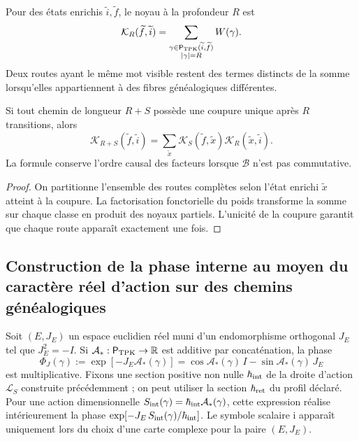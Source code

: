 Pour des états enrichis \(\widetilde i,\widetilde f\), le noyau à la
profondeur \(R\) est
\begin{equation}
 \mathcal K_R(\widetilde f,\widetilde i)
 =\sum_{\substack{
   \gamma\in\mathsf P_{\rm TPK}(\widetilde i,\widetilde f)\\
   |\gamma|=R}}
 W(\gamma).
 \label{x_reciprocidad:eq:kernel-genealogico-finito-rev2}
\end{equation}
Deux routes ayant le même mot visible restent des termes distincts de la somme
lorsqu’elles appartiennent à des fibres généalogiques différentes.

\begin{proposition}
\label{x_reciprocidad:prop:composicion-kernel-enriquecido-rev2}
Si tout chemin de longueur \(R+S\) possède une coupure unique après \(R\) transitions, alors
\[
 \mathcal K_{R+S}(\widetilde f,\widetilde i)
 =\sum_{\widetilde x}
 \mathcal K_S(\widetilde f,\widetilde x)
 \mathcal K_R(\widetilde x,\widetilde i).
\]
La formule conserve l’ordre causal des facteurs lorsque \(\mathcal B\) n’est pas
commutative.
\end{proposition}

\begin{proof}
On partitionne l’ensemble des routes complètes selon l’état enrichi
\(\widetilde x\) atteint à la coupure. La factorisation fonctorielle du poids
transforme la somme sur chaque classe en produit des noyaux partiels.
L’unicité de la coupure garantit que chaque route apparaît exactement une fois.
\end{proof}

\subsection{Construction de la phase interne au moyen du caractère réel d'action sur des chemins généalogiques}

Soit \((E,J_E)\) un espace euclidien réel muni d’un endomorphisme
orthogonal \(J_E\) tel que \(J_E^2=-I\). Si
\(\mathcal A_*:\mathsf P_{\rm TPK}\to\mathbb R\) est additive par
concaténation, la phase
\begin{equation}
 \Phi_J(\gamma)
 :=\exp[-J_E\mathcal A_*(\gamma)]
 =\cos\mathcal A_*(\gamma)\,I
  -\sin\mathcal A_*(\gamma)\,J_E
 \label{x_reciprocidad:eq:fase-interna-caminos-rev2}
\end{equation}
est multiplicative. Fixons une section positive non nulle \(\hbar_{\rm int}\) de la droite d'action \(\mathcal L_S\) construite précédemment ; on peut utiliser la section \(\hbar_{\rm ret}\) du profil déclaré. Pour une action dimensionnelle \(S_{\rm int}(\gamma)=\hbar_{\rm int}\mathcal A_*(\gamma)\), cette expression réalise intérieurement la phase \(\exp[-J_E\,S_{\rm int}(\gamma)/\hbar_{\rm int}]\). Le symbole scalaire \(\mathrm i\) apparaît uniquement lors du choix d'une carte complexe pour la paire \((E,J_E)\).

